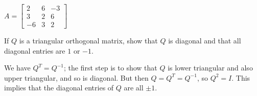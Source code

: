 \documentclass{ximera}
\begin{document}
\begin{problem}
\begin{problem}\label{prob:make_ortho_matrix6}
$A = \begin{bmatrix}
2 & 6 & -3 \\
3 & 2 & 6 \\
-6 & 3 & 2
\end{bmatrix}$
\end{problem}







\end{problem}

\begin{problem}\label{prob:triag_orthogonal}
If $Q$ is a triangular orthogonal matrix, show that $Q$ is diagonal and that all diagonal entries are $1$ or $-1$.

\begin{hint}
We have $Q^{T} = Q^{-1}$; the first step is to show that $Q$ is lower triangular and also upper triangular, and so is diagonal. But then $Q = Q^{T} = Q^{-1}$, so $Q^{2} = I$. This implies that the diagonal entries of $Q$ are all $\pm 1$.
\end{hint}
\end{problem}
\end{document}
